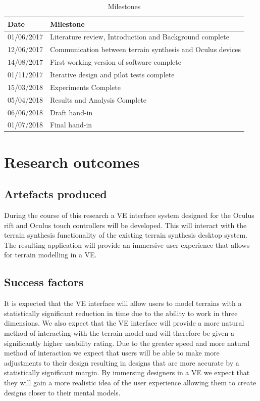 \documentclass{sig-alternate-05-2015}
\begin{document}
\begin{table}[H]
	\centering
	\begin{tabular}{m{2cm} |m{4cm}}
		Date & Milestone\\ \hline
		01/06/2017 & Literature review, Introduction and Background complete\\
		12/06/2017 & Communication between terrain synthesis and Oculus devices\\
		14/08/2017 & First working version of software complete\\
		01/11/2017 & Iterative design and pilot tests complete \\
		15/03/2018 & Experiments Complete\\
		05/04/2018 & Results and Analysis Complete\\
		06/06/2018 & Draft hand-in\\
		01/07/2018 & Final hand-in		
	\end{tabular}
\caption{Milestones}
\end{table}
\section{Research outcomes}
\subsection{Artefacts produced}
During the course of this research a VE interface system designed for the Oculus rift and Oculus touch controllers will be developed. This will interact with the terrain synthesis functionality of the existing terrain synthesis desktop system\cite{Gain2015}. The resulting application will provide an immersive user experience that allows for terrain modelling in a VE.
\subsection{Success factors}
It is expected that the VE interface will allow users to model terrains with a statistically significant reduction in time due to the ability to work in three dimensions. We also expect that the VE interface will provide a more natural method of interacting with the terrain model and will therefore be given a significantly higher usability rating. Due to the greater speed and more natural method of interaction we expect that users will be able to make more adjustments to their design resulting in designs that are more accurate by a statistically significant margin. By immersing designers in a VE we expect that they will gain a more realistic idea of the user experience allowing them to create designs closer to their mental models.
\end{document}
